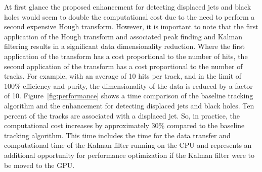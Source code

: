 \documentclass[preprint,sort&compress]{elsarticle}
\begin{document}
At first glance the proposed enhancement for detecting displaced jets and black holes would seem to double the computational cost due to the need to perform a second expensive Hough transform.  However, it is important to note that the first application of the Hough transform and associated peak finding and Kalman filtering results in a significant data dimensionality reduction.  Where the first application of the transform has a cost proportional to the number of hits, the second application of the transform has a cost proportional to the number of tracks.  For example, with an average of 10 hits per track, and in the limit of 100\% efficiency and purity, the dimensionality of the data is reduced by a factor of 10.  Figure~\ref{fig:performance} shows a time comparison of the baseline tracking algorithm and the enhancement for detecting displaced jets and black holes.  Ten percent of the tracks are associated with a displaced jet.  So, in practice, the computational cost increases by approximately 30\% compared to the baseline tracking algorithm.  This time includes the time for the data transfer and computational time of the Kalman filter running on the CPU and represents an additional opportunity for performance optimization if the Kalman filter were to be moved to the GPU.
\end{document}
